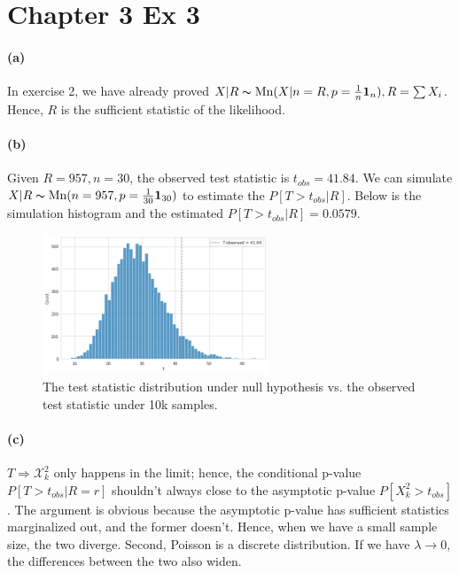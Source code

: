\documentclass[11pt, letterpaper]{article}
\begin{document}
\newpage
\section{Chapter 3 Ex 3}
\paragraph{(a)}
In exercise 2, we have already proved $X|R \thicksim \text{Mn}(X|n=R, p=\frac{1}{n}\mathbf{1}_n), R = \sum X_i$. Hence, $R$ is the sufficient statistic of the likelihood.

\paragraph{(b)}
Given $R=957, n=30$, the observed test statistic is $t_{obs} = 41.84$. We can simulate $X|R \thicksim \text{Mn}(n=957, p=\frac{1}{30}\mathbf{1}_{30})$ to estimate the $P[T>t_{obs}|R]$. Below is the simulation histogram and the estimated $P[T>t_{obs}|R] = 0.0579$.
\begin{figure}[!h]
  \centering
  \includegraphics[width=0.6\textwidth]{hw5-2.png}
  \captionsetup{justification=centering}
  \caption{The test statistic distribution under null hypothesis vs. the observed test statistic under 10k samples.}
  \label{fig:sufficient-logl}
\end{figure}

\paragraph{(c)}
$T \Rightarrow \mathcal{X}^2_{k}$ only happens in the limit; hence, the conditional p-value $P[T>t_{obs}|R=r]$ shouldn't always close to the asymptotic p-value $P[{X}^2_{k} > t_{obs}]$. The argument is obvious because the asymptotic p-value has sufficient statistics marginalized out, and the former doesn't. Hence, when we have a small sample size, the two diverge. Second, Poisson is a discrete distribution. If we have $\lambda \rightarrow 0$, the differences between the two also widen.
\end{document}

